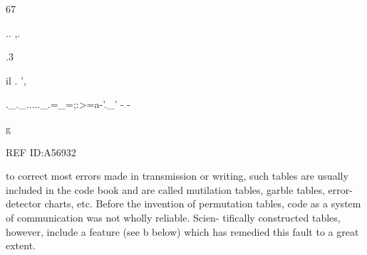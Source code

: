 67

  
 

..
,.

.3

il
.
',

 

._._....._.=_=;:>=a-'._' - -

g

 

 

REF ID:A56932

to correct most errors made in transmission or writing, such tables are
usually included in the code book and are called mutilation tables, garble
tables, error-detector charts, etc. Before the invention of permutation
tables, code as a system of communication was not wholly reliable. Scien-
tiﬁcally constructed tables, however, include a feature (see b below)
which has remedied this fault to a great extent.

